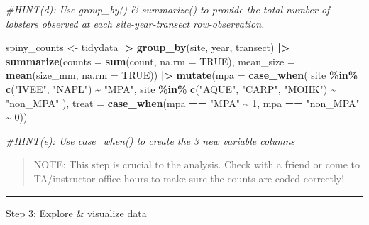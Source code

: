 \documentclass[
]{article}
\newenvironment{Shaded}{\begin{snugshade}}{\end{snugshade}}
\newcommand{\AttributeTok}[1]{\textcolor[rgb]{0.13,0.29,0.53}{#1}}
\newcommand{\CommentTok}[1]{\textcolor[rgb]{0.56,0.35,0.01}{\textit{#1}}}
\newcommand{\ConstantTok}[1]{\textcolor[rgb]{0.56,0.35,0.01}{#1}}
\newcommand{\DecValTok}[1]{\textcolor[rgb]{0.00,0.00,0.81}{#1}}
\newcommand{\FunctionTok}[1]{\textcolor[rgb]{0.13,0.29,0.53}{\textbf{#1}}}
\newcommand{\NormalTok}[1]{#1}
\newcommand{\OtherTok}[1]{\textcolor[rgb]{0.56,0.35,0.01}{#1}}
\newcommand{\SpecialCharTok}[1]{\textcolor[rgb]{0.81,0.36,0.00}{\textbf{#1}}}
\newcommand{\StringTok}[1]{\textcolor[rgb]{0.31,0.60,0.02}{#1}}
\begin{document}
\begin{Shaded}
\begin{Highlighting}[]
\CommentTok{\#HINT(d): Use \textasciigrave{}group\_by()\textasciigrave{} \& \textasciigrave{}summarize()\textasciigrave{} to provide the total number of lobsters observed at each site{-}year{-}transect row{-}observation. }

\NormalTok{spiny\_counts }\OtherTok{\textless{}{-}}\NormalTok{ tidydata }\SpecialCharTok{|\textgreater{}} 
    \FunctionTok{group\_by}\NormalTok{(site, year, transect) }\SpecialCharTok{|\textgreater{}} 
    \FunctionTok{summarize}\NormalTok{(}\AttributeTok{counts =} \FunctionTok{sum}\NormalTok{(count, }\AttributeTok{na.rm =} \ConstantTok{TRUE}\NormalTok{),}
              \AttributeTok{mean\_size =} \FunctionTok{mean}\NormalTok{(size\_mm, }\AttributeTok{na.rm =} \ConstantTok{TRUE}\NormalTok{)) }\SpecialCharTok{|\textgreater{}} 
    \FunctionTok{mutate}\NormalTok{(}\AttributeTok{mpa =} \FunctionTok{case\_when}\NormalTok{(}
\NormalTok{        site }\SpecialCharTok{\%in\%} \FunctionTok{c}\NormalTok{(}\StringTok{"IVEE"}\NormalTok{, }\StringTok{"NAPL"}\NormalTok{) }\SpecialCharTok{\textasciitilde{}} \StringTok{"MPA"}\NormalTok{,}
\NormalTok{        site }\SpecialCharTok{\%in\%} \FunctionTok{c}\NormalTok{(}\StringTok{"AQUE"}\NormalTok{, }\StringTok{"CARP"}\NormalTok{, }\StringTok{"MOHK"}\NormalTok{) }\SpecialCharTok{\textasciitilde{}} \StringTok{"non\_MPA"}
\NormalTok{    ), }\AttributeTok{treat =} \FunctionTok{case\_when}\NormalTok{(mpa }\SpecialCharTok{==} \StringTok{"MPA"} \SpecialCharTok{\textasciitilde{}} \DecValTok{1}\NormalTok{,}
\NormalTok{                        mpa }\SpecialCharTok{==} \StringTok{"non\_MPA"} \SpecialCharTok{\textasciitilde{}} \DecValTok{0}\NormalTok{))}

\CommentTok{\#HINT(e): Use \textasciigrave{}case\_when()\textasciigrave{} to create the 3 new variable columns}
\end{Highlighting}
\end{Shaded}

\begin{quote}
NOTE: This step is crucial to the analysis. Check with a friend or come
to TA/instructor office hours to make sure the counts are coded
correctly!
\end{quote}

\begin{center}\rule{0.5\linewidth}{0.5pt}\end{center}

Step 3: Explore \& visualize data
\end{document}
